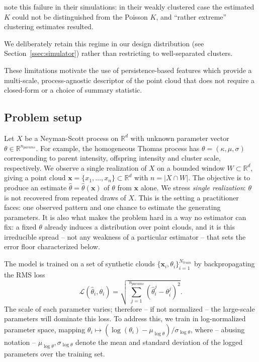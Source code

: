 \documentclass[11pt,a4paper]{article}
\newcommand{\R}{\mathbb{R}}
\newcommand{\pc}{\mathbf{x}}
\theoremstyle{definitioncolon}
\begin{document}
\citet{waagepetersen2009twostep} note this failure in their simulations:
in their weakly clustered case the estimated $K$ could not be distinguished from
the Poisson $K$, and ``rather extreme'' clustering estimates resulted.

We deliberately retain this regime in our design distribution (see
Section~\ref{ssec:simulator}) rather than restricting to well-separated
clusters.

These limitations motivate the use of persistence-based features which provide a
multi-scale, process-agnostic descriptor of the point cloud that does not require
a closed-form or a choice of summary statistic.

\subsection{Problem setup}
\label{ssec:setup}

Let $X$ be a Neyman-Scott process on $\R^d$ with unknown parameter vector
$\theta \in \R^{n_{params}}$. For example, the homogeneous Thomas process has
$\theta = (\kappa, \mu, \sigma)$ corresponding to parent intensity, offspring intensity and 
cluster scale, respectively. We observe a single realization of $X$ on a
bounded window $W \subset \R^d$, giving a point cloud
$\pc = \{x_1, \dots, x_n\} \subset \R^d$ with $n = |X \cap W|$. The objective is to
produce an estimate $\hat\theta = \hat\theta(\pc)$ of $\theta$ from $\pc$ alone.
We stress \emph{single realization}: $\theta$ is not recovered from repeated
draws of $X$. This is the setting a practitioner
faces: one observed pattern and one chance to estimate the generating parameters.
It is also what makes the problem hard in a way no estimator can fix: a
fixed $\theta$ already induces a distribution over point clouds, and it is this
irreducible
spread -- not any weakness of a particular estimator -- that sets the error floor
characterized below.

The model is trained on a set of synthetic clouds
$\{\pc_i, \theta_i\}_{i=1}^{N_{train}}$ by backpropagating the RMS loss
    \[
    \mathcal{L}(\hat\theta_i, \theta_i) = \sqrt{\sum_{j=1}^{n_{params}}(\hat\theta^j_i - \theta^j_i)^2}.
    \]
The scale of each
parameter varies; therefore -- if not normalized -- the
large-scale parameters will
dominate this loss. To address this, we train in log-normalized parameter space,
mapping $\theta_i \mapsto (\log(\theta_i) - \mu_{\log\theta})/\sigma_{\log\theta}$,
where -- abusing notation -- $\mu_{\log\theta}, \sigma_{\log\theta}$ denote the
mean and standard deviation of the logged parameters over the training set.
\end{document}
